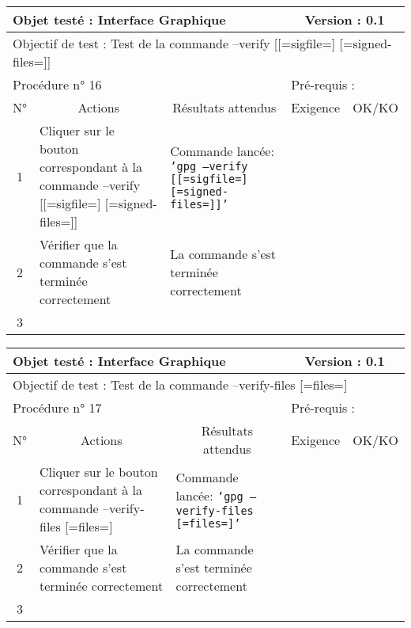 \documentclass{../res/univ-projet}
\begin{document}
\begin{center}
\begin{tabular}{|c|p{5cm}|p{5cm}|p{1.5cm}|p{1.5cm}|}
\hline
\multicolumn{3}{|l|}{Objet testé : Interface Graphique} & \multicolumn{2}{c|}{Version : 0.1}\\ \hline
\multicolumn{5}{|l|}{Objectif de test : Test de la commande –verify [[=sigfile=] [=signed-files=]]}\\ \hline
\multicolumn{3}{|l|}{Procédure n° 16} & \multicolumn{2}{p{3cm}|}{Pré-requis : }\\ \hline
\multicolumn{1}{|c|}{N°} & \multicolumn{1}{c|}{Actions} & \multicolumn{1}{c|}{Résultats attendus} & 
\multicolumn{1}{c|}{Exigence} & \multicolumn{1}{c|}{OK/KO}\\ \hline
1 & Cliquer sur le bouton correspondant à la commande –verify [[=sigfile=] [=signed-files=]] & Commande lancée: \texttt{'gpg –verify [[=sigfile=] [=signed-files=]]'} &  & \\
2 & Vérifier que la commande s'est terminée correctement & La commande s'est terminée correctement &  & \\
3 &  &  &  & \\ \hline
\end{tabular}
\vskip 2.2cm


\begin{tabular}{|c|p{5cm}|p{5cm}|p{1.5cm}|p{1.5cm}|}
\hline
\multicolumn{3}{|l|}{Objet testé : Interface Graphique} & \multicolumn{2}{c|}{Version : 0.1}\\ \hline
\multicolumn{5}{|l|}{Objectif de test : Test de la commande –verify-files [=files=]}\\ \hline
\multicolumn{3}{|l|}{Procédure n° 17} & \multicolumn{2}{p{3cm}|}{Pré-requis : }\\ \hline
\multicolumn{1}{|c|}{N°} & \multicolumn{1}{c|}{Actions} & \multicolumn{1}{c|}{Résultats attendus} & 
\multicolumn{1}{c|}{Exigence} & \multicolumn{1}{c|}{OK/KO}\\ \hline
1 & Cliquer sur le bouton correspondant à la commande –verify-files [=files=] & Commande lancée: \texttt{'gpg –verify-files [=files=]'} &  & \\
2 & Vérifier que la commande s'est terminée correctement & La commande s'est terminée correctement &  & \\
3 &  &  &  & \\ \hline
\end{tabular}
\vskip 2.2cm



\end{center}
\end{document}
